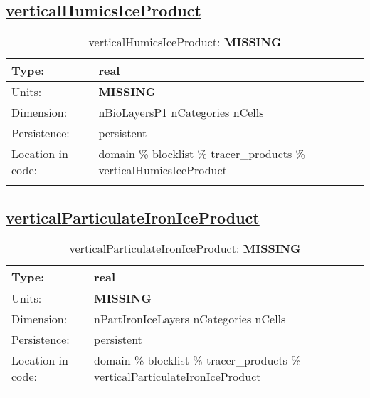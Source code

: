 \subsection[verticalHumicsIceProduct]{\hyperref[sec:var_tab_tracer_products]{verticalHumicsIceProduct}}
\label{subsec:var_sec_tracer_products_verticalHumicsIceProduct}
\begin{center}
\begin{longtable}{| p{2.0in} | p{4.0in} |}
        \hline 
        Type: & real \\
        \hline 
        Units: & {\bf \color{red} MISSING} \\
        \hline 
        Dimension: & nBioLayersP1 nCategories nCells \\
        \hline 
        Persistence: & persistent \\
        \hline 
         Location in code: & domain \% blocklist \% tracer\_products \% verticalHumicsIceProduct \\
         \hline 
    \caption{verticalHumicsIceProduct: {\bf \color{red} MISSING}}
\end{longtable}
\end{center}
\subsection[verticalParticulateIronIceProduct]{\hyperref[sec:var_tab_tracer_products]{verticalParticulateIronIceProduct}}
\label{subsec:var_sec_tracer_products_verticalParticulateIronIceProduct}
\begin{center}
\begin{longtable}{| p{2.0in} | p{4.0in} |}
        \hline 
        Type: & real \\
        \hline 
        Units: & {\bf \color{red} MISSING} \\
        \hline 
        Dimension: & nPartIronIceLayers nCategories nCells \\
        \hline 
        Persistence: & persistent \\
        \hline 
         Location in code: & domain \% blocklist \% tracer\_products \% verticalParticulateIronIceProduct \\
         \hline 
    \caption{verticalParticulateIronIceProduct: {\bf \color{red} MISSING}}
\end{longtable}
\end{center}
